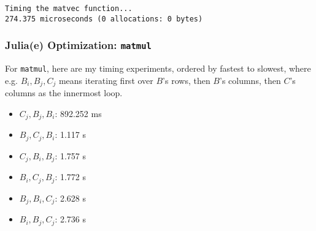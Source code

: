\documentclass[twoside,10pt]{article}
\begin{document}
\begin{verbatim}
Timing the matvec function...
274.375 microseconds (0 allocations: 0 bytes)
\end{verbatim}

\subsubsection*{Julia(e) Optimization: \texttt{matmul}}

For \texttt{matmul}, here are my timing experiments, ordered by fastest to slowest, where e.g. $B_i,B_j,C_j$ means iterating first over $B$'s rows, then $B$'s columns, then $C$'s columns as the innermost loop.

\begin{itemize}
  \item $C_j,B_j,B_i$: 892.252 ms
  \item $B_j,C_j,B_i$: 1.117 s
  \item $C_j,B_i,B_j$: 1.757 s
  \item $B_i,C_j,B_j$: 1.772 s
  \item $B_j,B_i,C_j$: 2.628 s
  \item $B_i,B_j,C_j$: 2.736 s
\end{itemize}
\end{document}
